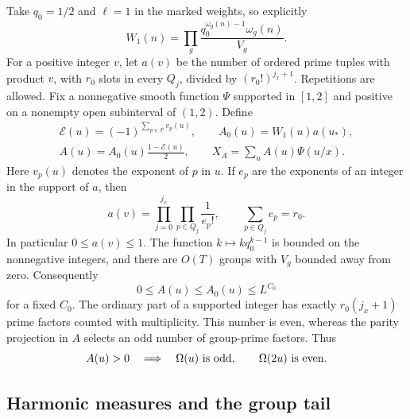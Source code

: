 Take $q_0=1/2$ and $\ell=1$ in the marked weights, so explicitly
\[
 W_1(n)=\prod_g \frac{q_0^{\omega_g(n)-1}\omega_g(n)}{V_g}.
\]
For a positive integer $v$, let $a(v)$ be the number of ordered prime
tuples with product $v$, with $r_0$ slots in every $Q_j$, divided by
$(r_0!)^{j_x+1}$. Repetitions are allowed. Fix a nonnegative smooth
function $\Psi$ supported in $[1,2]$ and positive on a nonempty open
subinterval of $(1,2)$. Define
\begin{equation}\label{wt:definition}
 \begin{gathered}
 \mathcal E(u)=(-1)^{\sum_{p\in\mathcal P}v_p(u)},\qquad
 A_0(u)=W_1(u)a(u_*),\\
 A(u)=A_0(u)\frac{1-\mathcal E(u)}2,
 \qquad X_A=\sum_u A(u)\Psi(u/x).
 \end{gathered}
\end{equation}
Here $v_p(u)$ denotes the exponent of $p$ in $u$.
If $e_p$ are the exponents of an integer in the support of $a$, then
\[
 a(v)=\prod_{j=0}^{j_x}\prod_{p\in Q_j}\frac1{e_p!},
 \qquad \sum_{p\in Q_j}e_p=r_0.
\]
In particular $0\le a(v)\le1$. The function
$k\mapsto kq_0^{k-1}$ is bounded on the nonnegative integers, and there
are $O(T)$ groups with $V_g$ bounded away from zero. Consequently
\begin{equation}\label{wt:pointwise}
 0\le A(u)\le A_0(u)\le L^{C_0}
\end{equation}
for a fixed $C_0$. The ordinary part of a supported integer has exactly
$r_0(j_x+1)$ prime factors counted with multiplicity. This number is
even, whereas the parity projection in $A$ selects an odd number of
group-prime factors. Thus
\begin{equation}\label{wt:parity}
 A(u)>0\quad\Longrightarrow\quad
 \Omega(u)\ \hbox{is odd},\qquad \Omega(2u)\ \hbox{is even}.
\end{equation}

\subsection{Harmonic measures and the group tail}


